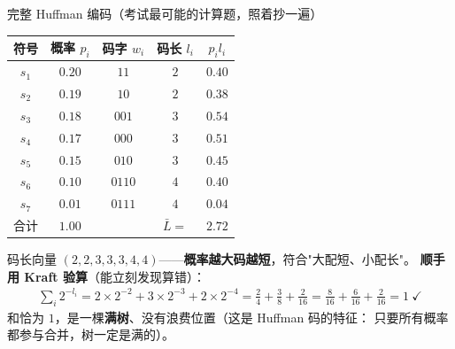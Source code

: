 \begin{calc}{完整 Huffman 编码（考试最可能的计算题，照着抄一遍）}
\begin{center}
\begin{tabular}{@{}ccccc@{}}
\toprule
符号 & 概率 $p_i$ & 码字 $w_i$ & 码长 $l_i$ & $p_il_i$\\
\midrule
$s_1$ & $0.20$ & $11$   & $2$ & $0.40$\\
$s_2$ & $0.19$ & $10$   & $2$ & $0.38$\\
$s_3$ & $0.18$ & $001$  & $3$ & $0.54$\\
$s_4$ & $0.17$ & $000$  & $3$ & $0.51$\\
$s_5$ & $0.15$ & $010$  & $3$ & $0.45$\\
$s_6$ & $0.10$ & $0110$ & $4$ & $0.40$\\
$s_7$ & $0.01$ & $0111$ & $4$ & $0.04$\\
\midrule
合计 & $1.00$ & & $\bar L=$ & $2.72$\\
\bottomrule
\end{tabular}
\end{center}

码长向量 $(2,2,3,3,3,4,4)$——\textbf{概率越大码越短}，符合"大配短、小配长"。
\textbf{顺手用 Kraft 验算}（能立刻发现算错）：
\begin{align*}
\sum_i2^{-l_i}=2\times2^{-2}+3\times2^{-3}+2\times2^{-4}
=\frac{2}{4}+\frac{3}{8}+\frac{2}{16}
=\frac{8}{16}+\frac{6}{16}+\frac{2}{16}=1\ \checkmark
\end{align*}
和恰为 $1$，是一棵\textbf{满树}、没有浪费位置（这是 Huffman 码的特征：
只要所有概率都参与合并，树一定是满的）。
\end{calc}

